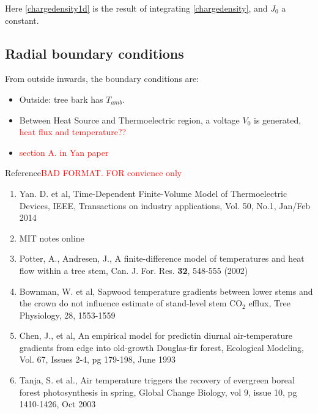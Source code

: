 \documentclass[12pt]{article}
\begin{document}
Here \eqref{chargedensity1d} is the result of integrating \eqref{chargedensity}, and $J_0$ a constant. 

\subsection{Radial boundary conditions}

From outside inwards, the boundary conditions are:
\begin{itemize}
\item Outside: tree bark has $T_{amb}$.
\item Between Heat Source and Thermoelectric region, a voltage $V_0$ is generated, \textcolor{red}{heat flux and temperature??}
\item \textcolor{red}{section A. in Yan paper}

\end{itemize}

\newpage
Reference\textcolor{red}{BAD FORMAT. FOR convience only}
\begin{enumerate}
\item Yan. D. et al, Time-Dependent Finite-Volume Model of Thermoelectric Devices, IEEE, Transactions on industry applications, Vol. 50, No.1, Jan/Feb 2014\label{thermoelectric}

\item MIT notes online\label{mit}

\item Potter, A., Andresen, J., A finite-difference model of temperatures and heat flow within a tree stem, Can. J. For. Res. \textbf{32}, 548-555 (2002)\label{heat}

\item Bownman, W. et al, Sapwood temperature gradients between lower stems and the crown do not influence estimate of stand-level stem CO$_2$ efflux, Tree Physiology, 28, 1553-1559\label{sapwood}

\item Chen, J., et al, An empirical model for predictin diurnal air-temperature gradients from edge into old-growth Douglas-fir forest, Ecological Modeling, Vol. 67, Issues 2-4, pg 179-198, June 1993\label{airtempforest}

\item Tanja, S. et al., Air temperature triggers the recovery of evergreen boreal forest photosynthesis in spring, Global Change Biology, vol 9, issue 10, pg 1410-1426, Oct 2003\label{evergreen}

\end{enumerate}
\end{document}
